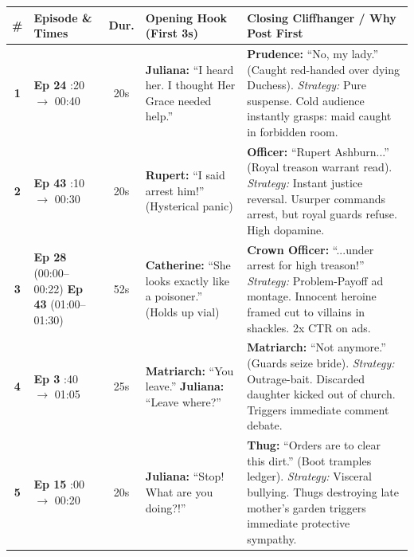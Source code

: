 \documentclass[9.5pt,a4paper]{article}
\begin{document}
\vspace{1pt}
\begin{center}
\scriptsize
\begin{tabularx}{\textwidth}{c l c X X}
\toprule
\textbf{\#} & \textbf{Episode \& Times} & \textbf{Dur.} & \textbf{Opening Hook (First 3s)} & \textbf{Closing Cliffhanger / Why Post First} \\
\midrule
\textbf{1} & \textbf{Ep 24} \newline 00:20 $\to$ 00:40 & 20s & \textbf{Juliana:} ``I heard her. I thought Her Grace needed help.'' & \textbf{Prudence:} ``No, my lady.'' (Caught red-handed over dying Duchess). \newline \textit{Strategy:} Pure suspense. Cold audience instantly grasps: maid caught in forbidden room. \\
\addlinespace[2pt]
\textbf{2} & \textbf{Ep 43} \newline 00:10 $\to$ 00:30 & 20s & \textbf{Rupert:} ``I said arrest him!'' (Hysterical panic) & \textbf{Officer:} ``Rupert Ashburn...'' (Royal treason warrant read). \newline \textit{Strategy:} Instant justice reversal. Usurper commands arrest, but royal guards refuse. High dopamine. \\
\addlinespace[2pt]
\textbf{3} & \textbf{Ep 28} (00:00--00:22) \newline \textbf{Ep 43} (01:00--01:30) & 52s & \textbf{Catherine:} ``She looks exactly like a poisoner.'' (Holds up vial) & \textbf{Crown Officer:} ``...under arrest for high treason!'' \newline \textit{Strategy:} Problem-Payoff ad montage. Innocent heroine framed cut to villains in shackles. 2x CTR on ads. \\
\addlinespace[2pt]
\textbf{4} & \textbf{Ep 3} \newline 00:40 $\to$ 01:05 & 25s & \textbf{Matriarch:} ``You leave.'' \newline \textbf{Juliana:} ``Leave where?'' & \textbf{Matriarch:} ``Not anymore.'' (Guards seize bride). \newline \textit{Strategy:} Outrage-bait. Discarded daughter kicked out of church. Triggers immediate comment debate. \\
\addlinespace[2pt]
\textbf{5} & \textbf{Ep 15} \newline 00:00 $\to$ 00:20 & 20s & \textbf{Juliana:} ``Stop! What are you doing?!'' & \textbf{Thug:} ``Orders are to clear this dirt.'' (Boot tramples ledger). \newline \textit{Strategy:} Visceral bullying. Thugs destroying late mother's garden triggers immediate protective sympathy. \\
\bottomrule
\end{tabularx}
\end{center}
\end{document}
